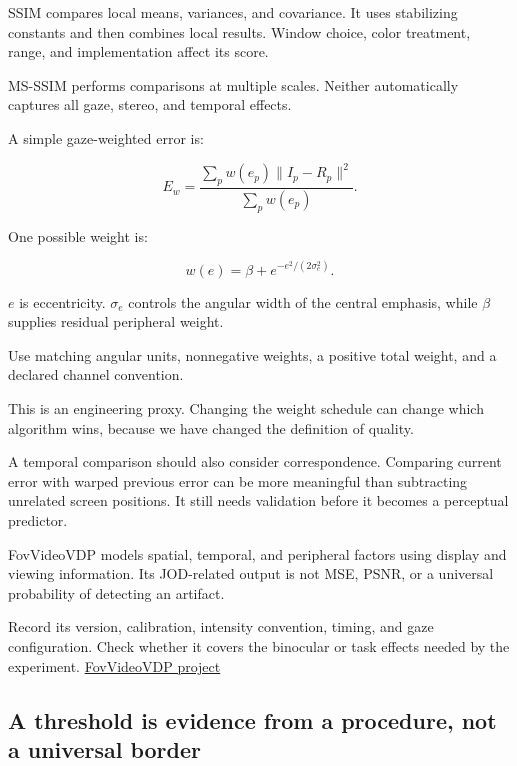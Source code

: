 \hypertarget{04-visual-computing-ii-ch042-structural-and-gaze-aware-comparisons-add-assumptions}{}

SSIM compares local means, variances, and covariance. It uses stabilizing constants and then combines local results. Window choice, color treatment, range, and implementation affect its score.

MS-SSIM performs comparisons at multiple scales. Neither automatically captures all gaze, stereo, and temporal effects.

A simple gaze-weighted error is:

\[
E_w=
\frac{\sum_p w(e_p)\lVert I_p-R_p\rVert^2}
{\sum_p w(e_p)}.
\]

One possible weight is:

\[
w(e)=\beta+e^{-e^2/(2\sigma_e^2)}.
\]

\(e\) is eccentricity. \(\sigma_e\) controls the angular width of the central emphasis, while \(\beta\) supplies residual peripheral weight.

Use matching angular units, nonnegative weights, a positive total weight, and a declared channel convention.

This is an engineering proxy. Changing the weight schedule can change which algorithm wins, because we have changed the definition of quality.

A temporal comparison should also consider correspondence. Comparing current error with warped previous error can be more meaningful than subtracting unrelated screen positions. It still needs validation before it becomes a perceptual predictor.

FovVideoVDP models spatial, temporal, and peripheral factors using display and viewing information. Its JOD-related output is not MSE, PSNR, or a universal probability of detecting an artifact.

Record its version, calibration, intensity convention, timing, and gaze configuration. Check whether it covers the binocular or task effects needed by the experiment. \href{https://www.cl.cam.ac.uk/research/rainbow/projects/fovvideovdp/}{FovVideoVDP project}

\subsection{A threshold is evidence from a procedure, not a universal border}\label{04-visual-computing-ii-ch042-a-threshold-is-evidence-from-a-procedure-not-a-universal-border}

\hypertarget{04-visual-computing-ii-ch042-a-threshold-is-evidence-from-a-procedure-not-a-universal-border}{}


